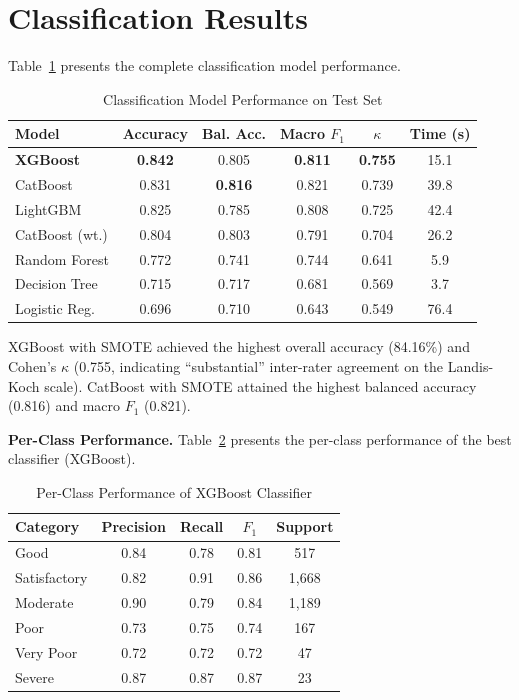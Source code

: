 \documentclass[12pt,a4paper]{report}
\begin{document}
\section{Classification Results}

Table~\ref{tab:classification_results} presents the complete classification model performance.

\begin{table}[H]
\centering
\caption{Classification Model Performance on Test Set}
\label{tab:classification_results}
\begin{tabular}{|l|c|c|c|c|c|}
\hline
\textbf{Model} & \textbf{Accuracy} & \textbf{Bal. Acc.} & \textbf{Macro $F_1$} & \textbf{$\kappa$} & \textbf{Time (s)} \\
\hline
\textbf{XGBoost} & \textbf{0.842} & 0.805 & \textbf{0.811} & \textbf{0.755} & 15.1 \\
\hline
CatBoost & 0.831 & \textbf{0.816} & 0.821 & 0.739 & 39.8 \\
\hline
LightGBM & 0.825 & 0.785 & 0.808 & 0.725 & 42.4 \\
\hline
CatBoost (wt.) & 0.804 & 0.803 & 0.791 & 0.704 & 26.2 \\
\hline
Random Forest & 0.772 & 0.741 & 0.744 & 0.641 & 5.9 \\
\hline
Decision Tree & 0.715 & 0.717 & 0.681 & 0.569 & 3.7 \\
\hline
Logistic Reg. & 0.696 & 0.710 & 0.643 & 0.549 & 76.4 \\
\hline
\end{tabular}
\end{table}

XGBoost with SMOTE achieved the highest overall accuracy (84.16\%) and Cohen's $\kappa$ (0.755, indicating ``substantial'' inter-rater agreement on the Landis-Koch scale). CatBoost with SMOTE attained the highest balanced accuracy (0.816) and macro $F_1$ (0.821).

\textbf{Per-Class Performance.} Table~\ref{tab:perclass} presents the per-class performance of the best classifier (XGBoost).

\begin{table}[H]
\centering
\caption{Per-Class Performance of XGBoost Classifier}
\label{tab:perclass}
\begin{tabular}{|l|c|c|c|c|}
\hline
\textbf{Category} & \textbf{Precision} & \textbf{Recall} & \textbf{$F_1$} & \textbf{Support} \\
\hline
Good & 0.84 & 0.78 & 0.81 & 517 \\
\hline
Satisfactory & 0.82 & 0.91 & 0.86 & 1,668 \\
\hline
Moderate & 0.90 & 0.79 & 0.84 & 1,189 \\
\hline
Poor & 0.73 & 0.75 & 0.74 & 167 \\
\hline
Very Poor & 0.72 & 0.72 & 0.72 & 47 \\
\hline
Severe & 0.87 & 0.87 & 0.87 & 23 \\
\hline
\end{tabular}
\end{table}
\end{document}
